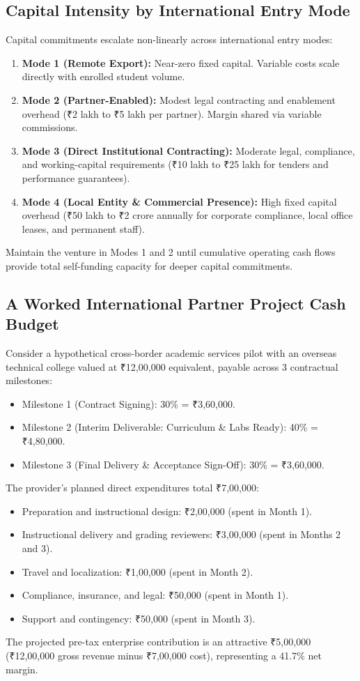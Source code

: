 \subsection{Capital Intensity by International Entry Mode}
\label{sec:capital_intensity_by_entry_mode}

Capital commitments escalate non-linearly across international entry modes:
\begin{enumerate}
\item \textbf{Mode 1 (Remote Export):} Near-zero fixed capital. Variable costs scale directly with enrolled student volume.
\item \textbf{Mode 2 (Partner-Enabled):} Modest legal contracting and enablement overhead (₹2 lakh to ₹5 lakh per partner). Margin shared via variable commissions.
\item \textbf{Mode 3 (Direct Institutional Contracting):} Moderate legal, compliance, and working-capital requirements (₹10 lakh to ₹25 lakh for tenders and performance guarantees).
\item \textbf{Mode 4 (Local Entity \& Commercial Presence):} High fixed capital overhead (₹50 lakh to ₹2 crore annually for corporate compliance, local office leases, and permanent staff).
\end{enumerate}
Maintain the venture in Modes 1 and 2 until cumulative operating cash flows provide total self-funding capacity for deeper capital commitments.

\subsection{A Worked International Partner Project Cash Budget}
\label{sec:worked_international_cash_budget}

Consider a hypothetical cross-border academic services pilot with an overseas technical college valued at ₹12,00,000 equivalent, payable across 3 contractual milestones:
\begin{itemize}
\item Milestone 1 (Contract Signing): 30\% = ₹3,60,000.
\item Milestone 2 (Interim Deliverable: Curriculum \& Labs Ready): 40\% = ₹4,80,000.
\item Milestone 3 (Final Delivery \& Acceptance Sign-Off): 30\% = ₹3,60,000.
\end{itemize}

The provider's planned direct expenditures total ₹7,00,000:
\begin{itemize}
\item Preparation and instructional design: ₹2,00,000 (spent in Month 1).
\item Instructional delivery and grading reviewers: ₹3,00,000 (spent in Months 2 and 3).
\item Travel and localization: ₹1,00,000 (spent in Month 2).
\item Compliance, insurance, and legal: ₹50,000 (spent in Month 1).
\item Support and contingency: ₹50,000 (spent in Month 3).
\end{itemize}
The projected pre-tax enterprise contribution is an attractive ₹5,00,000 (₹12,00,000 gross revenue minus ₹7,00,000 cost), representing a 41.7\% net margin.

